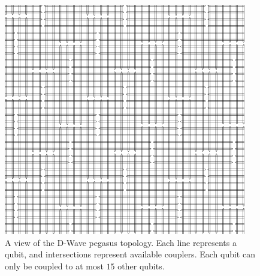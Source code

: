 \begin{figure}[htp]
    \centering
    \includegraphics[width=0.4\linewidth]{images/pegasus_topology.png}
    \caption[A view of the D-Wave pegasus topology. Each line represents a qubit, and intersections represent available couplers. Each qubit can only be coupled to at most $15$ other qubits.]{A view of the D-Wave pegasus topology. Each line represents a qubit, and intersections represent available couplers. Each qubit can only be coupled to at most $15$ other qubits. ~\protect\cite{dwaveadvantage}}
    \label{pegasustopology}
\end{figure}

